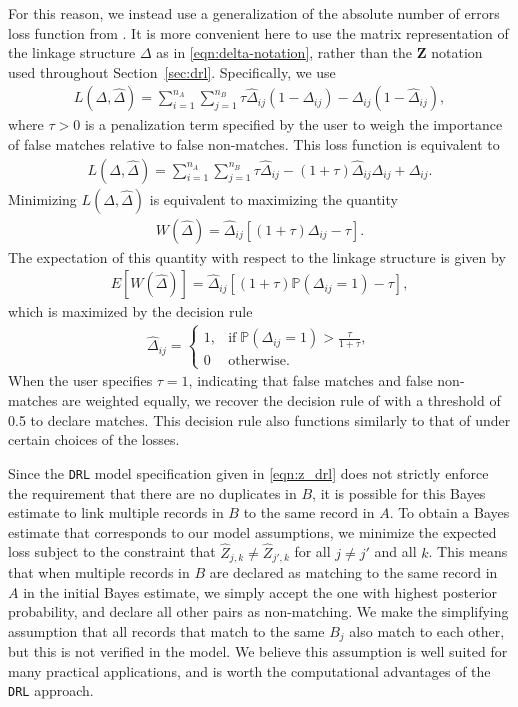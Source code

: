 \documentclass[12pt,letterpaper]{article}
\newcommand{\1}[1]{\mathbb{I}\!\left[#1\right]} %
\begin{document}
For this reason, we instead use a generalization of the absolute number of errors loss function from \cite{Tancredi_2011}. It is more convenient here to use the matrix representation of the linkage structure $\Delta$ as in \eqref{eqn:delta-notation}, rather than the $\bm{Z}$ notation used throughout Section~\ref{sec:drl}. Specifically, we use 
\begin{align}\label{eqn:loss function}
	L(\Delta, \hat{\Delta}) = \sum_{i = 1}^{n_A}\sum_{j = 1}^{n_B}\tau \hat{\Delta}_{ij}(1 - \Delta_{ij}) - \Delta_{ij}(1 - \hat{\Delta}_{ij}),
\end{align}
where $\tau > 0 $ is a penalization term specified by the user to weigh the importance of false matches relative to false non-matches. This loss function is equivalent to 
\begin{align}
	L(\Delta, \hat{\Delta}) = \sum_{i = 1}^{n_A}\sum_{j = 1}^{n_B}\tau \hat{\Delta}_{ij} - (1 + \tau)\hat{\Delta}_{ij}\Delta_{ij} + \Delta_{ij}.
\end{align}
Minimizing $L(\Delta, \hat{\Delta})$ is equivalent to maximizing the quantity
\begin{align}
	W(\hat{\Delta}) = \hat{\Delta}_{ij}[(1 + \tau) \Delta_{ij} - \tau].
\end{align}
The expectation of this quantity with respect to the linkage structure is given by 
\begin{align}
	E[W(\hat{\Delta})] =\hat{\Delta}_{ij}[(1 + \tau) \mathbb{P}(\Delta_{ij} = 1) - \tau],
\end{align}
which is maximized by the decision rule
\begin{align}\label{eqn:decision-rule}
	\hat{\Delta}_{ij} = \begin{cases}
		1,  &  \text{if}  \; \mathbb{P}(\Delta_{ij} = 1) > \frac{\tau}{1 + \tau},\\
		0 &   \text{otherwise}.
	\end{cases}
\end{align}
When the user specifies $\tau = 1$, indicating that false matches and false non-matches are weighted equally, we recover the decision rule of \cite{Tancredi_2011} with a threshold of 0.5 to declare matches. This decision rule also functions similarly to that of \cite{sadinle_bayesian_2017} under certain choices of the losses. 

Since the \texttt{DRL} model specification given in \eqref{eqn:z_drl} does not strictly enforce the requirement that there are no duplicates in $B$, it is possible for this Bayes estimate to link multiple records in $B$ to the same record in $A$. To obtain a Bayes estimate that corresponds to our model assumptions, we minimize the expected loss subject to the constraint that $\hat{Z}_{j, k} \neq \hat{Z}_{j', k}$ for all $j \neq j'$ and all $k$. This means that when multiple records in $B$ are declared as matching to the same record in $A$ in the initial Bayes estimate, we simply accept the one with highest posterior probability, and declare all other pairs as non-matching. We make the simplifying assumption that all records that match to the same $B_j$ also match to each other, but this is not verified in the model. We believe this assumption is well suited for many practical applications, and is worth the computational advantages of the \texttt{DRL} approach.
\end{document}
